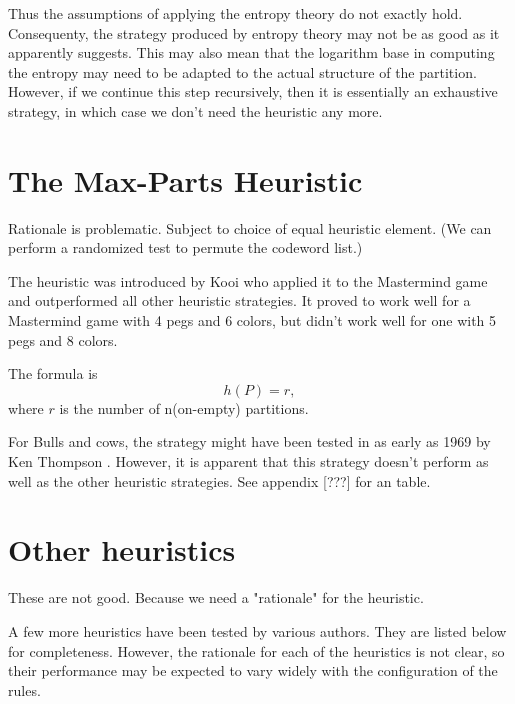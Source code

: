 Thus the assumptions of applying the entropy theory do not exactly hold. Consequenty, the strategy produced by entropy theory may not be as good as it apparently suggests. This may also mean that the logarithm base in computing the entropy may need to be adapted to the actual structure of the partition. However, if we continue this step recursively, then it is essentially an exhaustive strategy, in which case we don't need the heuristic any more.



\section{The Max-Parts Heuristic}

Rationale is problematic. Subject to choice of equal heuristic element. (We can perform a randomized test to permute the codeword list.)

The \maxpar{} heuristic was introduced by Kooi \cite{kooi05} who applied it to the Mastermind game and outperformed all other heuristic strategies. It proved to work well for a Mastermind game with 4 pegs and 6 colors, but didn't work well for one with 5 pegs and 8 colors.

The formula is
\[
h(P) = r ,
\]
where $r$ is the number of n(on-empty) partitions.


For Bulls and cows, the \maxpar{} strategy might have been tested in as early as 1969 by Ken Thompson \cite{ritchie01}. However, it is apparent that this strategy doesn't perform as well as the other heuristic strategies. See appendix [???] for an table.

\section{Other heuristics}




These are not good. Because we need a "rationale" for the heuristic. 

A few more heuristics have been tested by various authors. They are listed below for completeness. However, the rationale for each of the heuristics is not clear, so their performance may be expected to vary widely with the configuration of the rules.

